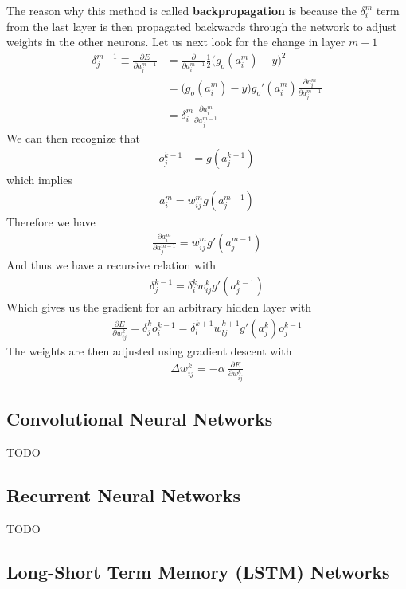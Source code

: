 The reason why this method is called \textbf{backpropagation} is because the $\delta_i^m$ term from the last layer is then propagated backwards through the network to adjust weights in the other neurons. Let us next look for the change in layer $m-1$
\begin{align}
	\delta_j^{m-1} \equiv \frac{\partial E}{\partial a_{j}^{m-1}} &= \frac{\partial}{\partial{a_i^{m-1}}}\frac{1}{2}\Big(g_o(a_{i}^m)-y\Big)^2 \\
	&=\Big(g_o(a_{i}^m)-y\Big)g_o'(a_{i}^m)\frac{\partial a_{i}^m}{\partial a_{j}^{m-1}}\\
	&= \delta_i^m \frac{\partial a_{i}^m}{\partial a_{j}^{m-1}}
\end{align}
We can then recognize that
\begin{align}
	o_j^{k-1} &= g(a_j^{k-1})
\end{align}
which implies
\begin{align}
	a_i^m = w_{ij}^m g(a_j^{m-1})
\end{align}
Therefore we have
\begin{align}
	\frac{\partial a_{i}^m}{\partial a_{j}^{m-1}} = w_{ij}^m g'(a_j^{m-1})
\end{align}
And thus we have a recursive relation with
\begin{align}
	\delta_j^{k-1} = \delta_i^k w_{ij}^k g'(a_j^{k-1})
\end{align}
Which gives us the gradient for an arbitrary hidden layer with
\begin{align}
	\frac{\partial E}{\partial w_{ij}^k} = \delta_j^{k}o_i^{k-1} = \delta_l^{k+1} w_{lj}^{k+1} g'(a_j^{k})o_j^{k-1}
\end{align}
The weights are then adjusted using gradient descent with
\begin{align}
	\Delta w_{ij}^k = -\alpha~  \frac{\partial E}{\partial w_{ij}^k}
\end{align}

\subsection{Convolutional Neural Networks}
TODO

\subsection{Recurrent Neural Networks}
TODO

\subsection{Long-Short Term Memory (LSTM) Networks}

